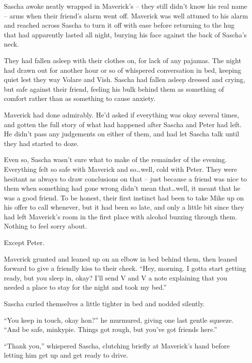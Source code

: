 \secdiv

Sascha awoke neatly wrapped in Maverick's -- they still didn't know his real name -- arms when their friend's alarm went off. Maverick was well attuned to his alarm and reached across Sascha to turn it off with ease before returning to the hug that had apparently lasted all night, burying his face against the back of Sascha's neck.

They had fallen asleep with their clothes on, for lack of any pajamas. The night had drawn out for another hour or so of whispered conversation in bed, keeping quiet lest they way Volare and Vish. Sascha had fallen asleep dressed and crying, but safe against their friend, feeling his bulk behind them as something of comfort rather than as something to cause anxiety.

Maverick had done admirably. He'd asked if everything was okay several times, and gotten the full story of what had happened after Sascha and Peter had left. He didn't pass any judgements on either of them, and had let Sascha talk until they had started to doze.

Even so, Sascha wasn't sure what to make of the remainder of the evening. Everything felt so safe with Maverick and so\ldots{}well, cold with Peter. They were hesitant as always to draw conclusions on that -- just because a friend was nice to them when something had gone wrong didn't mean that\ldots{}well, it meant that he was a good friend. To be honest, their first instinct had been to take Mike up on his offer to call whenever, but it had been so late, and only a little bit since they had left Maverick's room in the first place with alcohol buzzing through them. Nothing to feel sorry about.

Except Peter.

Maverick grunted and leaned up on an elbow in bed behind them, then leaned forward to give a friendly kiss to their cheek. ``Hey, morning. I gotta start getting ready, but you sleep in, okay? I'll send V and V a note explaining that you needed a place to stay for the night and took my bed.''

Sascha curled themselves a little tighter in bed and nodded silently.

``You keep in touch, okay hon?'' he murmured, giving one last gentle squeeze. ``And be safe, minkypie. Things got rough, but you've got friends here.''

``Thank you,'' whispered Sascha, clutching briefly at Maverick's hand before letting him get up and get ready to drive.

